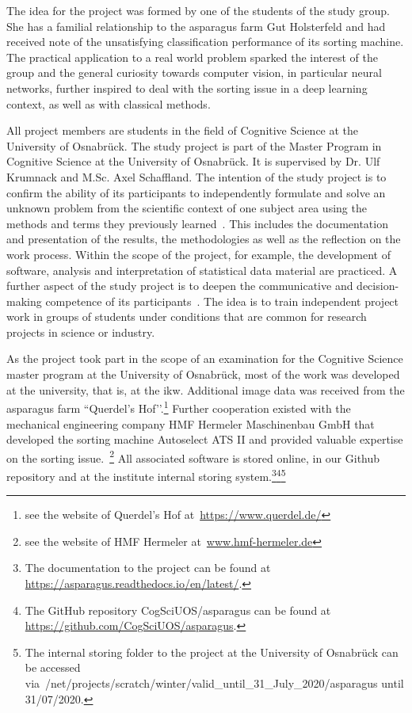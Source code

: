 The idea for the project was formed by one of the students of the study group. She has a familial relationship to the asparagus farm Gut Holsterfeld and had received note of the unsatisfying classification performance of its sorting machine. The practical application to a real world problem sparked the interest of the group and the general curiosity towards computer vision, in particular neural networks, further inspired to deal with the sorting issue in a deep learning context, as well as with classical methods.

All project members are students in the field of Cognitive Science at the University of Osnabr{\"u}ck. The study project is part of the Master Program in Cognitive Science at the University of Osnabr{\"u}ck. It is supervised by Dr. Ulf Krumnack and M.Sc. Axel Schaffland. The intention of the study project is to confirm the ability of its participants to independently formulate and solve an unknown problem from the scientific context of one subject area using the methods and terms they previously learned~\citep{moduledescription,studyregulations}. This includes the documentation and presentation of the results, the methodologies as well as the reflection on the work process. Within the scope of the project, for example, the development of software, analysis and interpretation of statistical data material are practiced. A further aspect of the study project is to deepen the communicative and decision-making competence of its participants~\citep{moduledescription}. The idea is to train independent project work in groups of students under conditions that are common for research projects in science or industry.

As the project took part in the scope of an examination for the Cognitive Science master program at the University of Osnabr{\"u}ck, most of the work was developed at the university, that is, at the \acrfull{ikw}. Additional image data was received from the asparagus farm ``Querdel’s Hof’’.\footnote{see the website of Querdel’s Hof at~\url{https://www.querdel.de/}} Further cooperation existed with the mechanical engineering company HMF Hermeler Maschinenbau GmbH that developed the sorting machine Autoselect ATS II and provided valuable expertise on the sorting issue.~\footnote{see the website of HMF Hermeler at~\url{www.hmf-hermeler.de}} All associated software is stored online, in our Github repository and at the institute internal storing system.\footnote{The documentation to the project can be found at \\ \url{https://asparagus.readthedocs.io/en/latest/}.}\footnote{The GitHub repository CogSciUOS/asparagus can be found at \\ \url{https://github.com/CogSciUOS/asparagus}.}\footnote{The internal storing folder to the project at the University of Osnabr{\"u}ck can be accessed via~/net/projects/scratch/winter/valid\_until\_31\_July\_2020/asparagus until 31/07/2020.}


